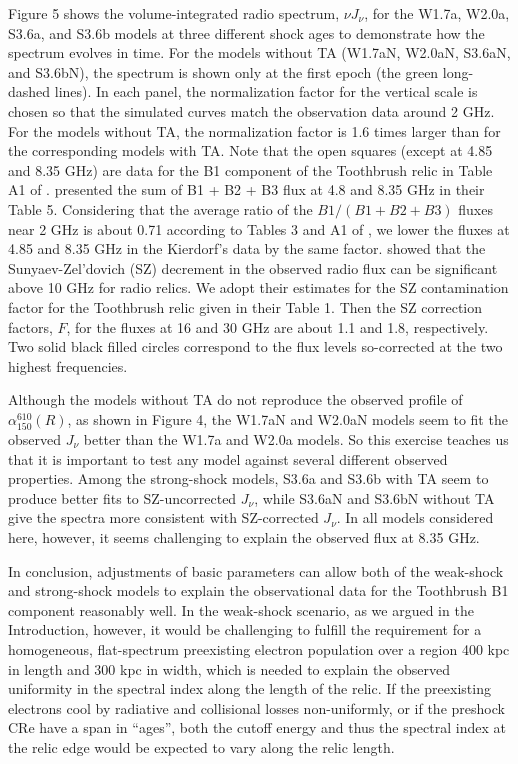 \documentclass[twocolumn]{aastex61}
\begin{document}
Figure 5 shows the volume-integrated radio spectrum, $\nu J_{\nu}$, for the W1.7a, W2.0a, S3.6a, and S3.6b models
at three different shock ages to demonstrate how the spectrum evolves in time.
For the models without TA (W1.7aN, W2.0aN, S3.6aN, and S3.6bN), the spectrum is shown 
only at the first epoch (the green long-dashed lines). 
In each panel, the normalization factor for the vertical scale is chosen so that the simulated curves
match the observation data around 2 GHz.
For the models without TA, 
the normalization factor is 1.6 times larger than for the corresponding models with TA.
Note that the open squares (except at 4.85 and 8.35 GHz) are data for the B1 component of the Toothbrush relic in Table A1 of
\citet{stroe16}. \citet{kierdorf16} presented the sum of B1 + B2 + B3 flux at 4.8 and 8.35 GHz
in their Table 5.
Considering that the average ratio of the $B1/(B1+B2+B3)$ fluxes near 2 GHz is about 0.71
according to Tables 3 and A1 of \citet{stroe16}, we lower the fluxes at 4.85 and 8.35 GHz in the Kierdorf's data
by the same factor. 
\citet{basu16} showed that the Sunyaev-Zel’dovich (SZ) decrement in the observed radio flux can be significant above 10 GHz 
for radio relics.
We adopt their estimates for the SZ contamination factor for the Toothbrush relic given in their Table 1.
Then the SZ correction factors, $F$, for the fluxes at 16 and 30 GHz are about 1.1 and 1.8, respectively. 
Two solid black filled circles correspond to the flux levels so-corrected at the two highest frequencies.

Although the models without TA do not reproduce the observed profile of $\alpha_{150}^{610} (R)$, as shown in Figure 4,
the W1.7aN and W2.0aN models seem to fit the observed $J_{\nu}$ better than the W1.7a and W2.0a models.
So this exercise teaches us that it is important to test any model against several different observed properties.
Among the strong-shock models, S3.6a and S3.6b with TA
seem to produce better fits to SZ-uncorrected $J_{\nu}$, 
while S3.6aN and S3.6bN without TA give the spectra more consistent with SZ-corrected $J_{\nu}$.
In all models considered here, however, it seems challenging to explain the observed flux at 8.35 GHz.

In conclusion, adjustments of basic parameters can allow
both of the weak-shock and strong-shock models
to explain the observational data for the Toothbrush B1 component reasonably well.
In the weak-shock scenario, as we argued in the Introduction, however, it would be challenging to fulfill 
the requirement for a homogeneous, flat-spectrum preexisting electron population over a region 
400 kpc in length and $300$ kpc in width, which is needed to explain the observed uniformity 
in the spectral index along the length of the relic.
If the preexisting electrons cool by radiative and collisional losses non-uniformly, 
or if the preshock CRe have a span in ``ages'', both the cutoff energy and thus
the spectral index at the relic edge would be expected to vary along the relic length.
\end{document}
